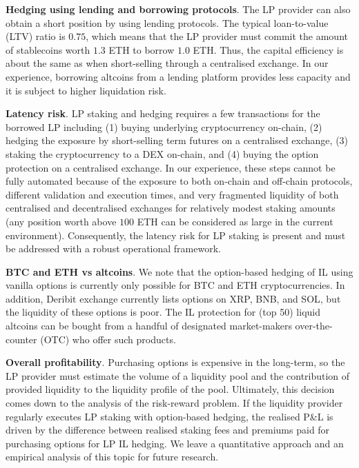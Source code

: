 \documentclass[pdftex,11pt,a4paper] {article}
\begin{document}
\textbf{Hedging using lending and borrowing protocols}. The LP provider can also obtain a short position by using lending protocols. The typical loan-to-value (LTV) ratio is $0.75$, which means that the LP provider must commit the amount of stablecoins worth $1.3$ ETH to borrow $1.0$ ETH. Thus, the capital efficiency is about the same as when short-selling through a centralised exchange. In our experience, borrowing altcoins from a lending platform provides less capacity and it is subject to higher liquidation risk.


\textbf{Latency risk}. LP staking and hedging requires a few transactions for the borrowed LP including (1) buying underlying cryptocurrency on-chain, (2) hedging the exposure by short-selling term futures on a centralised exchange, (3) staking the cryptocurrency to a DEX on-chain, and (4) buying the option protection on a centralised exchange. In our experience, these steps cannot be fully automated because of the exposure to both on-chain and off-chain protocols, different validation and execution times, and very fragmented liquidity of both centralised and decentralised exchanges for relatively modest staking amounts (any position worth above $100$ ETH can be considered as large in the current environment). Consequently, the latency risk for LP staking is present and must be addressed with a robust operational framework.


\textbf{BTC and ETH vs altcoins}. We note that the option-based hedging of IL using vanilla options is currently only possible for BTC and ETH cryptocurrencies. In addition, Deribit exchange currently lists options on XRP, BNB, and SOL, but the liquidity of these options is poor. The IL protection for (top 50) liquid altcoins can be bought from a handful of designated market-makers over-the-counter (OTC) who offer such products.


\textbf{Overall profitability}. Purchasing options is expensive in the long-term, so the LP provider must estimate the volume of a liquidity pool and the contribution of provided liquidity to the liquidity profile of the pool. Ultimately, this decision comes down to the analysis of the risk-reward problem. If the liquidity provider regularly executes LP staking with option-based hedging, the realised P\&L is driven by the difference between realised staking fees and premiums paid for purchasing options for LP IL hedging. We leave a quantitative approach and an empirical analysis of this topic for future research.
\end{document}

